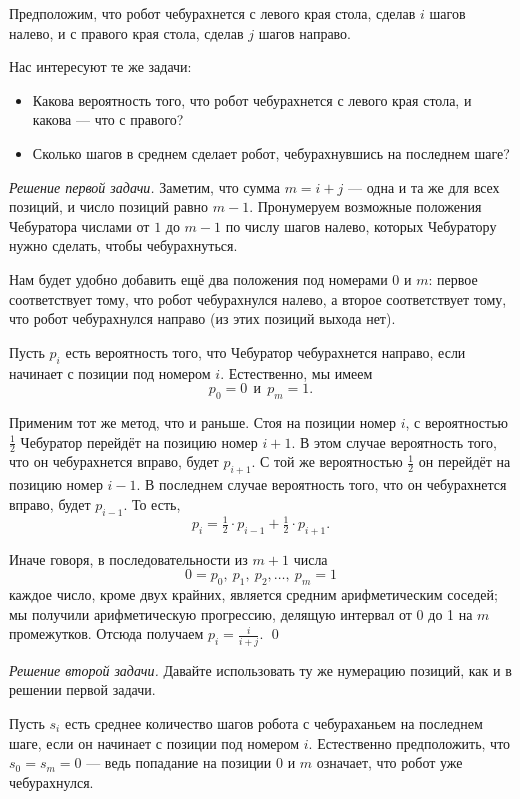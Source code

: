 \documentclass{article}
\begin{document}
Предположим, что робот чебурахнется с левого края стола, сделав $i$ шагов налево,
и с правого края стола, сделав $j$ шагов направо.

Нас интересуют те же задачи:

\begin{itemize}
\item Какова вероятность того, что робот чебурахнется с левого края стола, и какова --- что с правого?
\item Сколько шагов в среднем сделает робот, чебурахнувшись на последнем шаге?
\end{itemize}

\medskip
\noindent\textit{Решение первой задачи.}
Заметим, что сумма $m=i+j$ --- одна и та же для всех позиций, и число позиций равно $m-1$.
Пронумеруем возможные положения Чебуратора числами от $1$ до $m-1$
по числу шагов налево, которых Чебуратору нужно сделать, чтобы чебурахнуться.

Нам будет удобно добавить ещё два положения под номерами $0$ и $m$:
первое соответствует тому, что робот чебурахнулся налево, 
а второе соответствует тому, что робот чебурахнулся направо
(из этих позиций выхода нет).

Пусть $p_i$ есть вероятность того, что Чебуратор чебурахнется направо,
если начинает с позиции под номером $i$.
Естественно, мы имеем 
\[p_0=0\ \  \text{и}\ \  p_{m}=1.\]

Применим тот же метод, что и раньше.
Стоя на позиции номер $i$, с вероятностью $\tfrac12$ Чебуратор перейдёт на позицию номер $i+1$.
В этом случае вероятность того, что он чебурахнется вправо, будет $p_{i+1}$.
С той же вероятностью $\tfrac12$ он перейдёт на позицию номер $i-1$. 
В последнем случае вероятность того, что он чебурахнется вправо, будет $p_{i-1}$.
То есть,
\[p_i=\tfrac12\cdot p_{i-1}+\tfrac12\cdot p_{i+1}.\]

Иначе говоря, в последовательности из $m+1$ числа
\[0=p_0,\ p_1,\ p_2,\dots,\ p_{m}=1\] 
каждое число, кроме двух крайних, является средним арифметическим 
соседей; мы получили арифметическую прогрессию, делящую интервал от 0 до 1 на $m$ промежутков.
Отсюда получаем $p_i=\tfrac i{i+j}$.
\qed

\medskip
\noindent\textit{Решение второй задачи.}
Давайте использовать ту же нумерацию позиций, как и в решении первой задачи.

Пусть $s_i$ есть среднее количество шагов робота с чебураханьем на последнем шаге, если он начинает с позиции под номером $i$.
Естественно предположить, что $s_0=s_{m}=0$ ---
ведь попадание на позиции $0$ и $m$ означает, что робот уже чебурахнулся.
\end{document}
